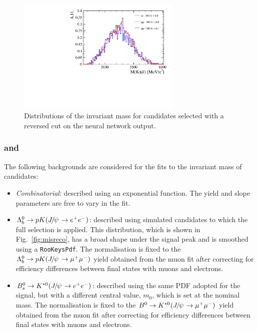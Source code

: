 \begin{figure}[t!]
\vspace{2cm}

\centering
\includegraphics[width=0.7\textwidth]{RKst/figs/Background/highq2_comb.pdf}
\caption{Distributions of the \mKpill invariant mass for \BdToKstll candidates selected with a reversed cut on the neural network output.}
\label{fig:highq2_comb}
\end{figure}

\subsubsection*{\BdToKstJPs and \BdToKstPsi}

The following backgrounds are considered for the fits to the invariant mass of \mbox{\BdToKstJPsee} candidates:
%
\begin{itemize}

\item \textit{Combinatorial}: described using an exponential function. The yield and slope parameters are free to vary in the fit.

\item $\Lb\to pK(\jpsi\to\ee)$: described using simulated candidates to which the full selection is applied. This distribution,
which is shown in Fig.~\ref{fig:misreco}, has a broad 
shape under the signal peak and is smoothed using a \texttt{RooKeysPdf}. The normalisation is fixed to the 
$\Lb\to pK(\jpsi\to\mumu)$ yield obtained from the muon fit after correcting for efficiency differences 
between final states with muons and electrons.

\item $\Bs\to\Kstarz(\jpsi\to\ee)$: described using the same PDF adopted for the signal, but with a different central value, 
$m_0$, which is set at the \Bs nominal mass. The normalisation is fixed to the $\Bd\to\Kstarz(\jpsi\to\mumu)$ yield 
obtained from the muon fit after correcting for efficiency differences between final states with muons and electrons.

\end{itemize}

